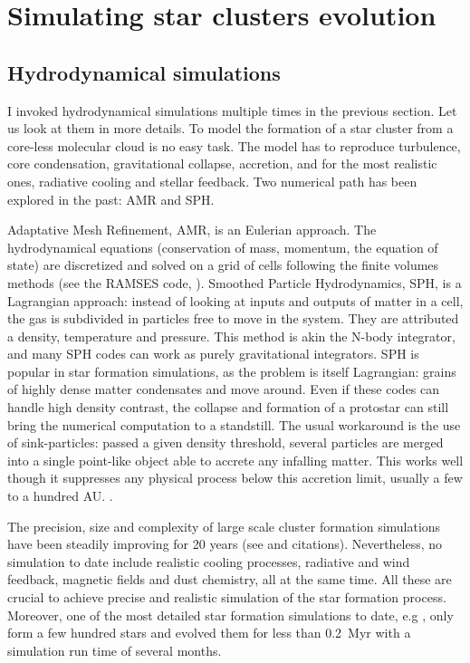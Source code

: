 \section{Simulating star clusters evolution}


\subsection{Hydrodynamical simulations}

I invoked hydrodynamical simulations multiple times in the previous section. Let us look at them in more details. To model the formation of a star cluster from a core-less molecular cloud is no easy task. The model has to reproduce turbulence, core condensation, gravitational collapse, accretion, and for the most realistic ones, radiative cooling and stellar feedback. Two numerical path has been explored in the past: AMR and SPH.

Adaptative Mesh Refinement, AMR, is an Eulerian approach. The hydrodynamical equations (conservation of mass, momentum, the equation of state) are discretized and solved on a grid of cells following the finite volumes methods (see the RAMSES code, \citealt{Teyssier2002}). Smoothed Particle Hydrodynamics, SPH, is a Lagrangian approach: instead of looking at inputs and outputs of matter in a cell, the gas is subdivided in particles free to move in the system. They are attributed a density, temperature and pressure. This method is akin the N-body integrator, and many SPH codes can work as purely gravitational integrators. SPH is popular in star formation simulations, as the problem is itself Lagrangian: grains of highly dense matter condensates and move around. Even if these codes can handle high density contrast, the collapse and formation of a protostar can still bring the numerical computation to a standstill. The usual workaround is the use of sink-particles: passed a given density threshold, several particles are merged into a single point-like object able to accrete any infalling matter. This works well though it suppresses any physical process below this accretion limit, usually a few to a hundred AU. \citep{Bate1997}.

The precision, size and complexity of large scale cluster formation simulations have been steadily improving for 20 years (see \citealt{Turner1995,Klessen2000,Bate2003,Offner2009,Myers2014} and citations). Nevertheless, no simulation to date include realistic cooling processes, radiative and wind feedback, magnetic fields and dust chemistry, all at the same time. All these are crucial to achieve precise and realistic simulation of the star formation process. Moreover, one of the most detailed star formation simulations to date, e.g \cite{Bate2012}, only form a few hundred stars and evolved them for less than 0.2~Myr with a simulation run time of several months.

